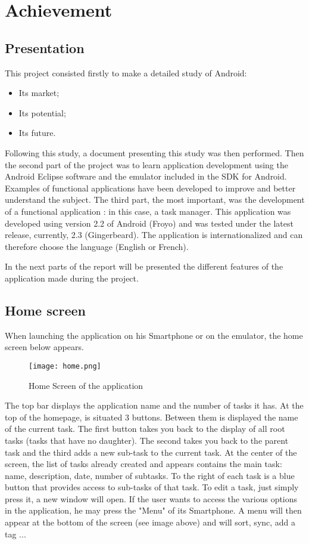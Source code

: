 \chapter{Achievement}

\section{Presentation}

This project consisted firstly to make a detailed study of Android:
\begin{itemize}
    \item Its market;
    \item Its potential;
    \item Its future.
\end{itemize}

Following this study, a document presenting this study was then performed.
Then the second part of the project was to learn application development using the Android Eclipse software and the emulator included in the SDK for Android.
Examples of functional applications have been developed to improve and better understand the subject.
The third part, the most important, was the development of a functional application : in this case, a task manager. This application was developed using version 2.2 of Android (Froyo) and was tested under the latest release, currently, 2.3 (Gingerbeard). The application is internationalized and can therefore choose the language (English or French).

In the next parts of the report will be presented the different features of the application made during the project.

\section{Home screen}

When launching the application on his Smartphone or on the emulator, the home screen below appears.

\begin{figure}[!ht]
	\centering
    \texttt{[image: home.png]}
    \caption{Home Screen of the application}
\end{figure}

The top bar displays the application name and the number of tasks it has.
At the top of the homepage, is situated 3 buttons. Between them is displayed the name of the current task. The first button takes you back to the display of all root tasks (tasks that have no daughter). The second takes you back to the parent task and the third adds a new sub-task to the current task.
At the center of the screen, the list of tasks already created and appears contains the main task: name, description, date, number of subtasks. To the right of each task is a blue button that provides access to sub-tasks of that task. To edit a task, just simply press it, a new window will open.
If the user wants to access the various options in the application, he may press the "Menu" of its Smartphone. A menu will then appear at the bottom of the screen (see image above) and will sort, sync, add a tag ...

